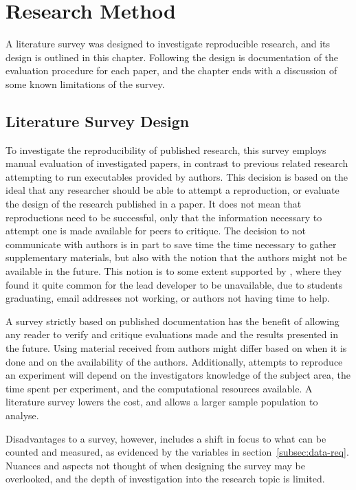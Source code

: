 
\chapter{Research Method}
\label{chap:survey-design}
A literature survey was designed to investigate reproducible research, and its design is outlined in this chapter. Following the design is documentation of the evaluation procedure for each paper, and the chapter ends with a discussion of some known limitations of the survey.

\section{Literature Survey Design}
To investigate the reproducibility of published research, this survey employs manual evaluation of investigated papers, in contrast to previous related research attempting to run executables provided by authors. This decision is based on the ideal that any researcher should be able to attempt a reproduction, or evaluate the design of the research published in a paper. It does not mean that reproductions need to be successful, only that the information necessary to attempt one is made available for peers to critique. The decision to not communicate with authors is in part to save time the time necessary to gather supplementary materials, but also with the notion that the authors might not be available in the future. This notion is to some extent supported by \cite{Collberg2016}, where they found it quite common for the lead developer to be unavailable, due to students graduating, email addresses not working, or authors not having time to help.

A survey strictly based on published documentation has the benefit of allowing any reader to verify and critique evaluations made and the results presented in the future. Using material received from authors might differ based on when it is done and on the availability of the authors. Additionally, attempts to reproduce an experiment will depend on the investigators knowledge of the subject area, the time spent per experiment, and the computational resources available. A literature survey lowers the cost, and allows a larger sample population to analyse.

Disadvantages to a survey, however, includes a shift in focus to what can be counted and measured, as evidenced by the variables in section~\ref{subsec:data-req}. Nuances and aspects not thought of when designing the survey may be overlooked, and the depth of investigation into the research topic is limited.

